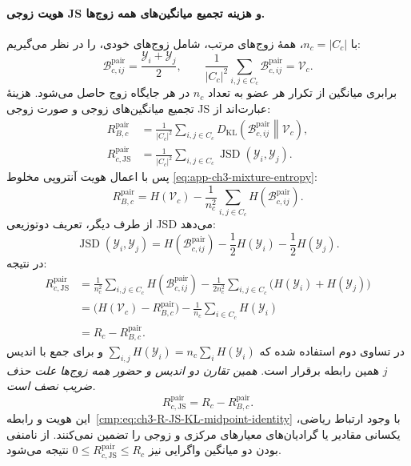 \paragraph{هویت زوجی JS و هزینه تجمیع میانگین‌های همه زوج‌ها.}
با $n_c=|C_c|$، همهٔ زوج‌های مرتب، شامل زوج‌های
خودی، را در نظر می‌گیریم:
\begin{equation}\label{cmp:eq:ch3-R-JS-pairwise-distributions}
\boxed{
\mathscr B_{c,ij}^{\mathrm{pair}}
=\frac{\mathscr Y_i+\mathscr Y_j}{2},
\qquad
\frac1{|C_c|^2}\sum_{i,j\in C_c}
\mathscr B_{c,ij}^{\mathrm{pair}}
=\mathcal V_c.
}
\end{equation}
برابری میانگین از تکرار هر عضو به تعداد $n_c$
در هر جایگاه زوج حاصل می‌شود. هزینهٔ تجمیع
میانگین‌های زوجی و صورت زوجی JS عبارت‌اند از:
\begin{equation}\label{cmp:eq:ch3-R-JS-pairwise-definitions}
\boxed{
\begin{aligned}
R_{B,c}^{\mathrm{pair}}
&=\frac1{|C_c|^2}\sum_{i,j\in C_c}
D_{\mathrm{KL}}\!
\left(\mathscr B_{c,ij}^{\mathrm{pair}}\middle\|
\mathcal V_c\right),\\
R_{c,\mathrm{JS}}^{\mathrm{pair}}
&=\frac1{|C_c|^2}\sum_{i,j\in C_c}
\operatorname{JSD}(\mathscr Y_i,\mathscr Y_j).
\end{aligned}}
\end{equation}
پس با اعمال هویت آنتروپی مخلوط
\eqref{eq:app-ch3-mixture-entropy}:
\begin{equation}\label{eq:app-ch3-RB-pairwise-entropy}
R_{B,c}^{\mathrm{pair}}
=H(\mathcal V_c)
-\frac1{n_c^2}\sum_{i,j\in C_c}
H(\mathscr B_{c,ij}^{\mathrm{pair}}).
\end{equation}
از طرف دیگر، تعریف دوتوزیعی JSD
می‌دهد:
\[
\operatorname{JSD}(\mathscr Y_i,\mathscr Y_j)
=H(\mathscr B_{c,ij}^{\mathrm{pair}})
-\frac12H(\mathscr Y_i)
-\frac12H(\mathscr Y_j).
\]
در نتیجه:
\begin{equation}\label{eq:app-ch3-R-JS-pairwise-proof}
\begin{aligned}
R_{c,\mathrm{JS}}^{\mathrm{pair}}
&=\frac1{n_c^2}\sum_{i,j\in C_c}
H(\mathscr B_{c,ij}^{\mathrm{pair}})
-\frac1{2n_c^2}\sum_{i,j\in C_c}
\bigl(H(\mathscr Y_i)+H(\mathscr Y_j)\bigr)\\
&=\bigl(H(\mathcal V_c)-R_{B,c}^{\mathrm{pair}}\bigr)
-\frac1{n_c}\sum_{i\in C_c}H(\mathscr Y_i)\\
&=R_c-R_{B,c}^{\mathrm{pair}}.
\end{aligned}
\end{equation}
در تساوی دوم استفاده شده که
$\sum_{i,j}H(\mathscr Y_i)
=n_c\sum_iH(\mathscr Y_i)$
و برای جمع با اندیس $j$
همین رابطه برقرار است.
\emph{همین تقارن دو اندیس و حضور
همه زوج‌ها علت حذف ضریب نصف است.}
\begin{equation}\label{cmp:eq:ch3-R-JS-pairwise-entropy-identity}
\boxed{
R_{c,\mathrm{JS}}^{\mathrm{pair}}
=R_c-R_{B,c}^{\mathrm{pair}}.
}
\end{equation}
این هویت و رابطه~\eqref{cmp:eq:ch3-R-JS-KL-midpoint-identity}
با وجود ارتباط ریاضی، یکسانی مقادیر یا گرادیان‌های
معیارهای مرکزی و زوجی را تضمین نمی‌کنند.
از نامنفی بودن دو میانگین واگرایی
نیز $0\le R_{c,\mathrm{JS}}^{\mathrm{pair}}
\le R_c$ نتیجه می‌شود.

